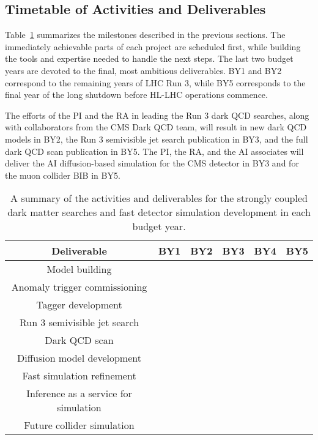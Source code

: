 \subsection{Timetable of Activities and Deliverables}

Table~\ref{tab:activities} summarizes the milestones described in the previous sections.
The immediately achievable parts of each project are scheduled first,
while building the tools and expertise needed to handle the next steps.
The last two budget years are devoted to the final, most ambitious deliverables.
BY1 and BY2 correspond to the remaining years of LHC Run 3, while BY5 corresponds to the final year of the long shutdown before HL-LHC operations commence.

The efforts of the PI and the RA in leading the Run 3 dark QCD searches, along with collaborators from the CMS Dark QCD team,
will result in new dark QCD models in BY2, the Run 3 semivisible jet search publication in BY3, and the full dark QCD scan publication in BY5.
The PI, the RA, and the AI associates will deliver the AI diffusion-based simulation for the CMS detector in BY3
and for the muon collider BIB in BY5.

\begin{table}[!hbtp]
\vspace{\myfigurespacing}
\begin{center}
\begin{tabular}{|c|c|c|c|c|c|}
\hline
Deliverable & BY1 & BY2 & BY3 & BY4 & BY5 \\
\hline
Model building & \cellcolor{blue!25} & \cellcolor{blue!25} & & & \\
\hline
Anomaly trigger commissioning & \cellcolor{blue!25} & \cellcolor{blue!25} & & & \\
\hline
Tagger development & & \cellcolor{blue!25} & \cellcolor{blue!25} & & \\
\hline
Run 3 semivisible jet search & & \cellcolor{blue!50} & \cellcolor{blue!50} & & \\
\hline
Dark QCD scan & & & \cellcolor{blue!75} & \cellcolor{blue!75} & \cellcolor{blue!75} \\
\hline
\hline
Diffusion model development & \cellcolor{orange!25} & \cellcolor{orange!25} & \cellcolor{orange!25} & & \\
\hline
Fast simulation refinement & \cellcolor{orange!25} & \cellcolor{orange!25} & \cellcolor{orange!25} & & \\
\hline
Inference as a service for simulation & & \cellcolor{orange!50} & \cellcolor{orange!50} & \cellcolor{orange!50} & \\
\hline
Future collider simulation & & & & \cellcolor{orange!75} & \cellcolor{orange!75} \\
\hline
\end{tabular}
\vspace{\myfigureskip}
\caption{A summary of the activities and deliverables for the strongly coupled dark matter searches and fast detector simulation development in each budget year.}
\label{tab:activities}
\end{center}
\end{table}

\clearpage
